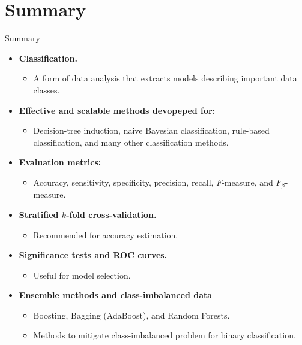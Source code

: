 \section{Summary}

\begin{frame}{Summary}
	\begin{itemize}
		\item \textbf{Classification.}
		      \begin{itemize}
			      \item A form of data analysis that extracts models describing important data classes.
		      \end{itemize}
		\item \textbf{Effective and scalable methods devopeped for:}
		      \begin{itemize}
			      \item Decision-tree induction, naive Bayesian classification, rule-based classification, and many other classification methods.
		      \end{itemize}
		\item \textbf{Evaluation metrics:}
		      \begin{itemize}
			      \item Accuracy, sensitivity, specificity, precision, recall, $F$-measure, and $F_\beta$-measure.
		      \end{itemize}
		\item \textbf{Stratified $k$-fold cross-validation.}
		      \begin{itemize}
			      \item Recommended for accuracy estimation.
		      \end{itemize}
		\item \textbf{Significance tests and ROC curves.}
		      \begin{itemize}
			      \item Useful for model selection.
		      \end{itemize}
		\item \textbf{Ensemble methods and class-imbalanced data}
		      \begin{itemize}
			      \item Boosting, Bagging (AdaBoost), and Random Forests.
			      \item Methods to mitigate class-imbalanced problem for binary classification.
		      \end{itemize}
	\end{itemize}
\end{frame}
